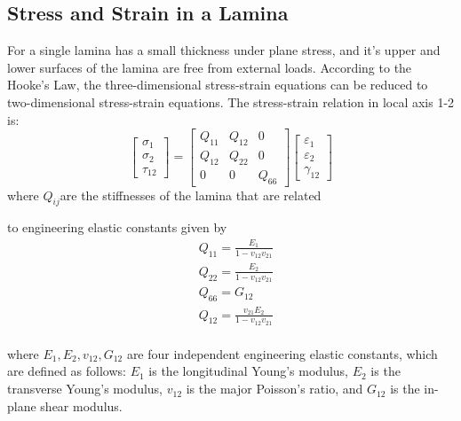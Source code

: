 \subsection{Stress and Strain in a Lamina}
For a single lamina has a small thickness under plane stress, and it's upper and lower surfaces of the lamina are
free from external loads. According to the Hooke's Law, the three-dimensional stress-strain equations can be reduced to
two-dimensional stress-strain equations. The stress-strain relation in local axis 1-2 is:
\begin{equation}
    \begin{bmatrix}
        \sigma _1\\
        \sigma _2\\
        \tau_{12}
    \end{bmatrix}
    =
    \begin{bmatrix}
        Q_{11} & Q_{12} & 0\\
        Q_{12} & Q_{22} & 0\\
        0      &  0     & Q_{66}
    \end{bmatrix}
    \begin{bmatrix}
        \varepsilon_1\\
        \varepsilon_2\\\gamma_{12}
    \end{bmatrix}
\end{equation}
where $Q_{ij} $are the stiffnesses of the lamina that are related

to engineering elastic constants given by
\begin{equation}
    \begin{split}
    &Q_{11}=\frac{E_1}{1-v_{12}v_{21}}\\
    &Q_{22}=\frac{E_2}{1-v_{12}v_{21}}\\
    &Q_{66}=G_{12}\\
    &Q_{12}=\frac{v_{21}E_2}{1-v_{12}v_{21}}\\
    \end{split}
\end{equation}

where $E_1, E_2, v_{12}, G_{12} $ are four independent engineering elastic constants, which are defined as follows: $E_1 $ is the longitudinal Young's modulus, $E_2 $ is the transverse Young's modulus, $v_{12} $ is the major Poisson's ratio, and $G_{12} $ is the in-plane shear modulus.

